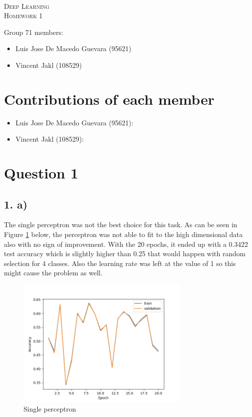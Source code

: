 \documentclass[11pt]{article}
\begin{document}
\begin{center}
  \mbox{}\\[2.0cm]
  \textsc{\Huge Deep Learning}\\[1.0cm]
  \textsc{\Large Homework 1}\\[0.5cm]
\end{center}
\begin{flushleft}
  Group 71 members: \\[0.5cm]
  \begin{itemize}
  \item Luis Jose De Macedo Guevara (95621)
  \item Vincent Jakl (108529)
  \end{itemize}
\end{flushleft}

\section{Contributions of each member}
\begin{itemize}
    \item Luis Jose De Macedo Guevara (95621):
    \item Vincent Jakl (108529):
\end{itemize}
\pagebreak
\section{Question 1}
\subsection{1. a)}
The single perceptron was not the best choice for this task.
As can be seen in Figure \ref{fig:single_layer_perceptron} below, the perceptron was not able to fit to the high dimensional data also with no sign of improvement.
With the 20 epochs, it ended up with a 0.3422 test accuracy which is slightly higher than 0.25 that would happen with random selection for 4 classes.
Also the learning rate was left at the value of 1 so this might cause the problem as well.
\begin{figure}[h!]
  \centering
  \includegraphics[width=0.75\textwidth]{./plots/single_perceptron.png}
  \caption{Single perceptron}\label{fig:single_layer_perceptron}
\end{figure}
\end{document}
